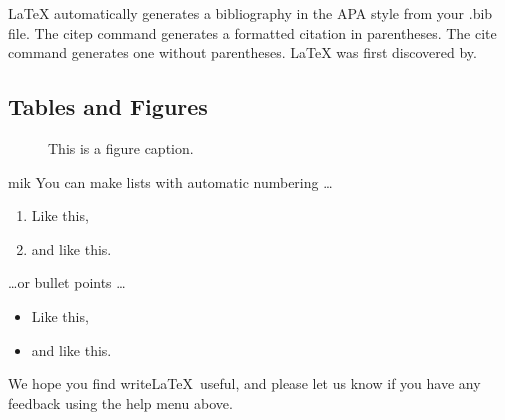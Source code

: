 \documentclass[a4paper,man,natbib]{apa6}
\begin{document}
LaTeX automatically generates a bibliography in the APA style from your .bib file. The citep command generates a formatted citation in parentheses. The cite command generates one without parentheses. LaTeX was first discovered by.

\subsection{Tables and Figures}



\begin{figure}
\centering
\caption{\label{fig:frog}This is a figure caption.}
\end{figure}



mik
You can make lists with automatic numbering \dots

\begin{enumerate}
\item Like this,
\item and like this.
\end{enumerate}
\dots or bullet points \dots
\begin{itemize}
\item Like this,
\item and like this.
\end{itemize}

We hope you find write\LaTeX\ useful, and please let us know if you have any feedback using the help menu above.



\end{document}
